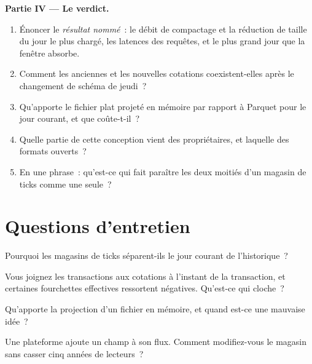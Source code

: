 \begin{problem}
\medskip\noindent\textbf{Partie IV --- Le verdict.}
\begin{enumerate}[resume]
\item Énoncer le \emph{résultat nommé}~: le débit de compactage et la réduction de taille du jour le plus chargé, les latences des requêtes, et le
plus grand jour que la fenêtre absorbe.
\item Comment les anciennes et les nouvelles cotations coexistent-elles après le changement de schéma de jeudi~?
\item Qu'apporte le fichier plat projeté en mémoire par rapport à Parquet pour le jour courant, et que coûte-t-il~?
\item Quelle partie de cette conception vient des  propriétaires, et laquelle des formats ouverts~?
\item En une phrase~: qu'est-ce qui fait paraître les deux moitiés d'un magasin de ticks comme une seule~?
\end{enumerate}
\end{problem}

\section{Questions d'entretien}

\begin{interviewq}\label{iq:pl:a-tick-store-on-open-formats:1}
Pourquoi les magasins de ticks séparent-ils le jour courant de l'historique~?
\end{interviewq}

\begin{interviewq}\label{iq:pl:a-tick-store-on-open-formats:2}
Vous joignez les transactions aux cotations à l'instant de la transaction, et certaines fourchettes effectives ressortent négatives. Qu'est-ce qui cloche~?
\end{interviewq}

\begin{interviewq}\label{iq:pl:a-tick-store-on-open-formats:3}
Qu'apporte la projection d'un fichier en mémoire, et quand est-ce une mauvaise idée~?
\end{interviewq}

\begin{interviewq}\label{iq:pl:a-tick-store-on-open-formats:4}
Une plateforme ajoute un champ à son flux. Comment modifiez-vous le magasin sans casser cinq années de lecteurs~?
\end{interviewq}

